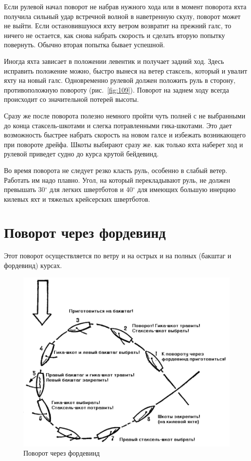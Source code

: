 \documentclass[a4paper, 12pt, twoside, final]{scrbook}
\begin{document}
Если рулевой начал поворот не набрав нужного хода или в момент поворота яхта получила сильный удар встречной волной в наветренную скулу, поворот может не выйти. Если остановившуюся яхту ветром возвратит на прежний галс, то ничего не остается, как снова набрать скорость и сделать вторую попытку повернуть. Обычно вторая попытка бывает успешной.

Иногда яхта зависает в положении левентик и получает задний ход. Здесь исправить положение можно, быстро вынеся на ветер стаксель, который и увалит яхту на новый галс. Одновременно рулевой должен положить руль в сторону, противоположную повороту (рис.~\ref{fig:109}). Поворот на заднем ходу всегда происходит со значительной потерей высоты.

Сразу же после поворота полезно немного пройти чуть полней с не выбранными до конца стаксель-шкотами и слегка потравленными гика-шкотами. Это дает возможность быстрее набрать скорость на новом галсе и избежать возникающего при повороте дрейфа. Шкоты выбирают сразу же. как только яхта наберет ход и рулевой приведет судно до курса крутой бейдевинд.

Во время поворота не следует резко класть руль, особенно в слабый ветер. Работать им надо плавно. Угол, на который перекладывают руль, не должен превышать 30$^\circ$ для легких швертботов и 40$^\circ$ для имеющих большую инерцию килевых яхт и тяжелых крейсерских швертботов.

\section{Поворот через фордевинд}

Этот поворот осуществляется по ветру и на острых и на полных (бакштаг и фордевинд) курсах.

\begin{figure}[htbp]
   \centering
   \includegraphics{110_Povorot_fordevind} %
   \caption{Поворот через фордевинд}
   \label{fig:110}
\end{figure}
\end{document}
